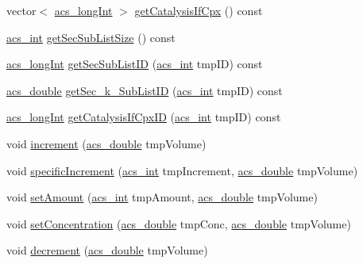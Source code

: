 \begin{DoxyCompactItemize}
vector$<$ \hyperlink{acs__headers_8h_a19319d75f02db4308bc5c0026d98cd85}{acs\-\_\-long\-Int} $>$ \hyperlink{classspecies_aaafd2738231ba916153e24c19e7b3bfc}{get\-Catalysis\-If\-Cpx} () const 
\item 
\hyperlink{acs__headers_8h_a8d277355641a098190360234e2ebde35}{acs\-\_\-int} \hyperlink{classspecies_a984df86838272204e7a8414bbc2a61fb}{get\-Sec\-Sub\-List\-Size} () const 
\item 
\hyperlink{acs__headers_8h_a19319d75f02db4308bc5c0026d98cd85}{acs\-\_\-long\-Int} \hyperlink{classspecies_a214be9ae628e99e47dfd9d72c8c07933}{get\-Sec\-Sub\-List\-I\-D} (\hyperlink{acs__headers_8h_a8d277355641a098190360234e2ebde35}{acs\-\_\-int} tmp\-I\-D) const 
\item 
\hyperlink{acs__headers_8h_ab776853a005fcbf56af0424a2a4dd607}{acs\-\_\-double} \hyperlink{classspecies_a6c546c89a974434e24f2161867521462}{get\-Sec\-\_\-k\-\_\-\-Sub\-List\-I\-D} (\hyperlink{acs__headers_8h_a8d277355641a098190360234e2ebde35}{acs\-\_\-int} tmp\-I\-D) const 
\item 
\hyperlink{acs__headers_8h_a19319d75f02db4308bc5c0026d98cd85}{acs\-\_\-long\-Int} \hyperlink{classspecies_aac1880e5779d75ef8c700bee278da15d}{get\-Catalysis\-If\-Cpx\-I\-D} (\hyperlink{acs__headers_8h_a8d277355641a098190360234e2ebde35}{acs\-\_\-int} tmp\-I\-D) const 
\item 
void \hyperlink{classspecies_a77f68017e5c50f8943df90efd2e8a0bb}{increment} (\hyperlink{acs__headers_8h_ab776853a005fcbf56af0424a2a4dd607}{acs\-\_\-double} tmp\-Volume)
\item 
void \hyperlink{classspecies_a87e85a2397e5ec34518efa235b529d7e}{specific\-Increment} (\hyperlink{acs__headers_8h_a8d277355641a098190360234e2ebde35}{acs\-\_\-int} tmp\-Increment, \hyperlink{acs__headers_8h_ab776853a005fcbf56af0424a2a4dd607}{acs\-\_\-double} tmp\-Volume)
\item 
void \hyperlink{classspecies_abefdc30b6f352e5ce5576a610015f5b8}{set\-Amount} (\hyperlink{acs__headers_8h_a8d277355641a098190360234e2ebde35}{acs\-\_\-int} tmp\-Amount, \hyperlink{acs__headers_8h_ab776853a005fcbf56af0424a2a4dd607}{acs\-\_\-double} tmp\-Volume)
\item 
void \hyperlink{classspecies_a018a8f55746849f4814b4d281d4aca5a}{set\-Concentration} (\hyperlink{acs__headers_8h_ab776853a005fcbf56af0424a2a4dd607}{acs\-\_\-double} tmp\-Conc, \hyperlink{acs__headers_8h_ab776853a005fcbf56af0424a2a4dd607}{acs\-\_\-double} tmp\-Volume)
\item 
void \hyperlink{classspecies_ae5142c6ab199459bc1d7d5945c761f0e}{decrement} (\hyperlink{acs__headers_8h_ab776853a005fcbf56af0424a2a4dd607}{acs\-\_\-double} tmp\-Volume)

\end{DoxyCompactItemize}
